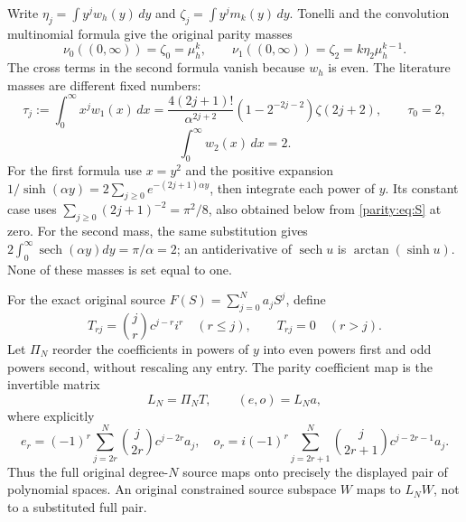 \documentclass[11pt]{article}
\begin{document}
Write $\eta_j=\int y^jw_h(y)\,dy$ and
$\zeta_j=\int y^jm_k(y)\,dy$. Tonelli and the convolution
multinomial formula give the original parity masses
\begin{equation}\label{parity:eq:masses}
 \nu_0((0,\infty))=\zeta_0=\mu_h^k,
 \qquad \nu_1((0,\infty))=\zeta_2=k\eta_2\mu_h^{k-1}.
\end{equation}
The cross terms in the second formula vanish because $w_h$ is
even. The literature masses are different fixed numbers:
\begin{equation}\label{parity:eq:raw-moments}
 \tau_j:=\int_0^\infty x^j w_1(x)\,dx
 =\frac{4(2j+1)!}{\alpha^{2j+2}}
        (1-2^{-2j-2})\zeta(2j+2),\qquad \tau_0=2,
\end{equation}
\[
 \int_0^\infty w_2(x)\,dx=2.
\]
For the first formula use $x=y^2$ and the positive expansion
$1/\sinh(\alpha y)=2\sum_{j\geq0}e^{-(2j+1)\alpha y}$,
then integrate each power of $y$. Its constant case uses
$\sum_{j\geq0}(2j+1)^{-2}=\pi^2/8$, also obtained below from
\eqref{parity:eq:S} at zero. For the second mass, the same substitution
gives $2\int_0^\infty\operatorname{sech}(\alpha y)dy=\pi/\alpha=2$;
an antiderivative of $\operatorname{sech} u$ is
$\arctan(\sinh u)$. None of these masses is set equal to one.

For the exact original source $F(S)=\sum_{j=0}^Na_jS^j$, define
\[
 T_{rj}=\binom jr c^{j-r}i^r\quad(r\leq j),\qquad T_{rj}=0\quad(r>j).
\]
Let $\Pi_N$ reorder the coefficients in powers of $y$ into even
powers first and odd powers second, without rescaling any entry.
The parity coefficient map is the invertible matrix
\begin{equation}\label{parity:eq:source-map}
 L_N=\Pi_NT,\qquad (e,o)=L_Na,
\end{equation}
where explicitly
\[
 e_r=(-1)^r\sum_{j=2r}^N\binom j{2r}c^{j-2r}a_j,
 \quad
 o_r=i(-1)^r\sum_{j=2r+1}^N\binom j{2r+1}c^{j-2r-1}a_j.
\]
Thus the full original degree-$N$ source maps onto precisely the
displayed pair of polynomial spaces. An original constrained
source subspace $W$ maps to $L_NW$, not to a substituted full pair.
\end{document}
